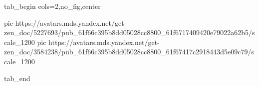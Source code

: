  
 
 
 
 


\ifcmt
  tab_begin cols=2,no_fig,center

     pic https://avatars.mds.yandex.net/get-zen_doc/5227693/pub_61f66c395b8dd05028cc8800_61f6717409420e79022a62b5/scale_1200
		 pic https://avatars.mds.yandex.net/get-zen_doc/3584238/pub_61f66c395b8dd05028cc8800_61f67417c2918443d5e09c79/scale_1200

  tab_end
\fi
